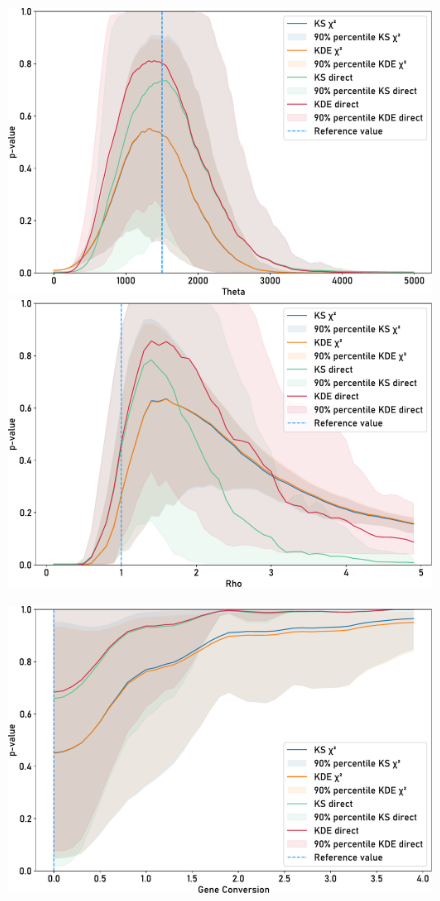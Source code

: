 \begin{figure}[]
    \centering
    \begin{minipage}{0.49\textwidth}
        \includegraphics[width=\textwidth]{figures/neutrality_test/gc_0_theta.pdf}\\
        \includegraphics[width=\textwidth]{figures/neutrality_test/gc_0_rho.pdf}
    \end{minipage}
    \begin{minipage}{0.49\textwidth}
        \includegraphics[width=\textwidth]{figures/neutrality_test/gc_0_gc.pdf}\\

\end{minipage}
\end{figure}
